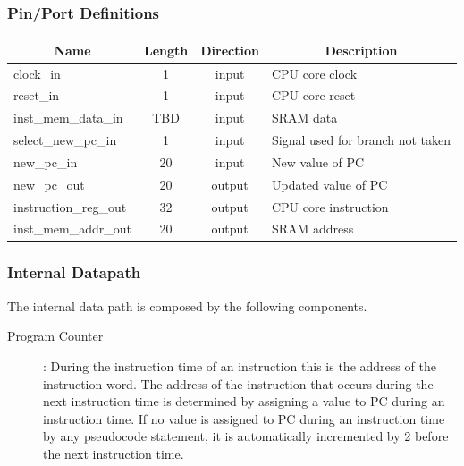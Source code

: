 \documentclass{article}
\begin{document}
  \subsubsection{Pin/Port Definitions}
  \FloatBarrier
  \begin{table}[H]
    \begin{center}
      \begin{tabular}[pos]{| l | c | c | m{7cm} |} \hline 	
      \multicolumn{1}{|c|}{\cellcolor[gray]{0.9}\textbf{Name}} & 
      \multicolumn{1}{c|}{\cellcolor[gray]{0.9}\textbf{Length}} & 
      \multicolumn{1}{c|}{\cellcolor[gray]{0.9}\textbf{Direction}} &
      \multicolumn{1}{c|}{\cellcolor[gray]{0.9}\textbf{Description}} \\ \hline
	 clock\_in 		          & 1 	& input 	& CPU core clock  	\\ \hline
	 reset\_in 		          & 1	  & input		& CPU core reset  	\\ \hline
	 inst\_mem\_data\_in     & TBD	& input 	& SRAM data \\ \hline
     select\_new\_pc\_in    & 1   & input   & Signal used for branch not taken \\ \hline
     new\_pc\_in    & 20   & input   & New value of PC \\ \hline
   
	 new\_pc\_out 		        & 20	& output 	& Updated value of PC \\ \hline
	 instruction\_reg\_out 	      & 32	& output 	& CPU core instruction  \\ \hline
	 inst\_mem\_addr\_out 	      & 20	& output	& SRAM address \\ \hline
      \end{tabular}
    \end{center}
  \end{table} 

  \subsubsection{Internal Datapath} 
  The internal data path is composed by the following components.

  \begin{description}
    \item [Program Counter]: During the instruction time of an instruction this is the
address of the instruction word. The address of the instruction that occurs during
the next instruction time is determined by assigning a value to PC during an instruction time. If no value is assigned to PC during an instruction time by any pseudocode statement, it is automatically incremented by 2 before the next
instruction time.

  \end{description}
\end{document}
